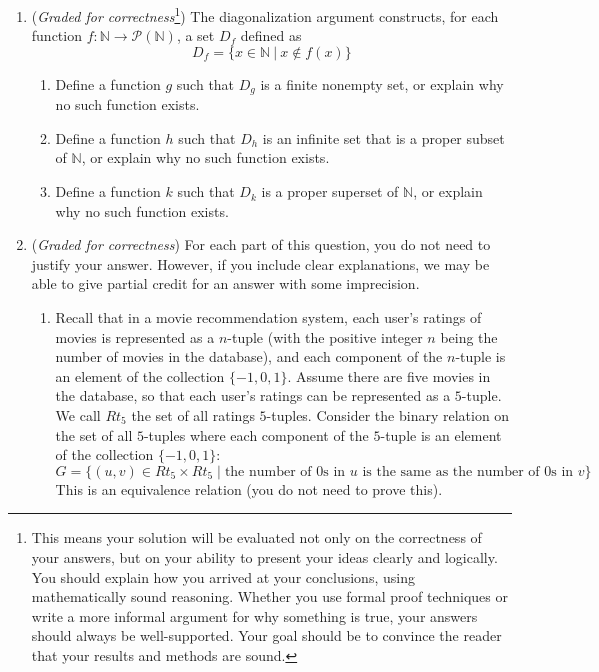 \begin{enumerate}
    \item ({\it Graded for correctness}\footnote{This means your solution will be
    evaluated not only on the correctness of your answers, but on your ability to 
    present your ideas clearly and logically. You should explain how you arrived at 
    your conclusions, using 
    mathematically sound reasoning. Whether you use formal proof techniques or 
    write a more informal argument for why 
    something is true, your answers should always be well-supported. Your goal 
    should be to convince the reader that 
    your results and methods are sound.})
    The diagonalization argument constructs, for each function 
    $f: \mathbb{N} \to \mathcal{P}(\mathbb{N})$, a set $D_f$ defined as
    \[
    D_f = \{ x \in \mathbb{N} ~|~ x \notin f(x) \}
    \]
    \begin{enumerate}
        \item Define a function $g$ such that $D_g$ is a finite nonempty set, 
        or explain why no such function exists.
        \item Define a function $h$ such that $D_h$ is an infinite set that is a proper subset of 
        $\mathbb{N}$, or explain why no such function exists.
        \item Define a function $k$ such that $D_k$ is a proper superset
        of $\mathbb{N}$, or explain why no such function exists.
    \end{enumerate}    
    
    \item ({\it Graded for correctness}) For each part of this question, you do not need to justify your answer.  
    However, if you include clear explanations, 
    we may be able to give partial credit for an answer with some imprecision.
        
    \begin{enumerate}
    \item Recall that 
    in a movie recommendation system, each 
    user's ratings of movies is represented as a $n$-tuple (with the positive integer $n$ 
    being the number of movies in the database), and each component of 
    the $n$-tuple is an element of the collection $\{-1,0,1\}$. Assume there are five movies in the database, 
    so that each user's ratings
    can be represented as a $5$-tuple. We call $Rt_5$ the set of all ratings $5$-tuples.
    Consider the binary relation on the  set of all 
    $5$-tuples where each  component of the $5$-tuple is an element of the collection $\{-1,0,1\}$:
    \[
        G = \{ (u,v) \in Rt_5 \times Rt_5 \mid \text{the number of $0$s in $u$ is the same as the number of $0$s in $v$} \}
    \]
    This is an equivalence relation (you do not need to prove this).


\end{enumerate}
\end{enumerate}
